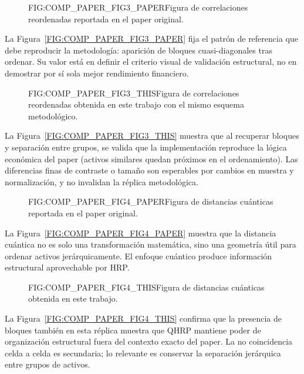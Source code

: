 \begin{figure}[Comparación visual Fig. 3 (paper)]{FIG:COMP_PAPER_FIG3_PAPER}{Figura de correlaciones reordenadas reportada en el paper original.}
\end{figure}

La Figura~\ref{FIG:COMP_PAPER_FIG3_PAPER} fija el patrón de referencia que debe reproducir la metodología: aparición de bloques cuasi-diagonales tras ordenar. Su valor está en definir el criterio visual de validación estructural, no en demostrar por sí sola mejor rendimiento financiero.

\begin{figure}[Comparación visual Fig. 3 (este trabajo)]{FIG:COMP_PAPER_FIG3_THIS}{Figura de correlaciones reordenadas obtenida en este trabajo con el mismo esquema metodológico.}
\end{figure}

La Figura~\ref{FIG:COMP_PAPER_FIG3_THIS} muestra que al recuperar bloques y separación entre grupos, se valida que la implementación reproduce la lógica económica del paper (activos similares quedan próximos en el ordenamiento). Las diferencias finas de contraste o tamaño son esperables por cambios en muestra y normalización, y no invalidan la réplica metodológica.

\begin{figure}[Comparación visual Fig. 4 (paper)]{FIG:COMP_PAPER_FIG4_PAPER}{Figura de distancias cuánticas reportada en el paper original.}
\end{figure}

La Figura~\ref{FIG:COMP_PAPER_FIG4_PAPER} muestra que la distancia cuántica no es solo una transformación matemática, sino una geometría útil para ordenar activos jerárquicamente. El enfoque cuántico produce información estructural aprovechable por HRP.

\begin{figure}[Comparación visual Fig. 4 (este trabajo)]{FIG:COMP_PAPER_FIG4_THIS}{Figura de distancias cuánticas obtenida en este trabajo.}
\end{figure}

La Figura~\ref{FIG:COMP_PAPER_FIG4_THIS} confirma que la presencia de bloques también en esta réplica muestra que QHRP mantiene poder de organización estructural fuera del contexto exacto del paper. La no coincidencia celda a celda es secundaria; lo relevante es conservar la separación jerárquica entre grupos de activos.

